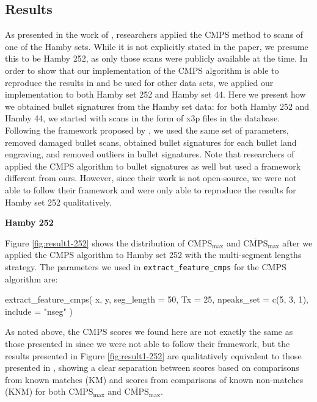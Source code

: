 \hypertarget{results}{%
\subsection{Results}\label{results}}

As presented in the work of \citet{cmps}, researchers applied the CMPS
method to scans of one of the Hamby sets. While it is not explicitly
stated in the paper, we presume this to be Hamby 252, as only those
scans were publicly available at the time. In order to show that our
implementation of the CMPS algorithm is able to reproduce the results in
\citet{cmps} and be used for other data sets, we applied our
implementation to both Hamby set 252 and Hamby set 44. Here we present
how we obtained bullet signatures from the Hamby set data: for both
Hamby 252 and Hamby 44, we started with scans in the form of x3p files
in the database. Following the framework proposed by \citet{aoas}, we
used the same set of parameters, removed damaged bullet scans, obtained
bullet signatures for each bullet land engraving, and removed outliers
in bullet signatures. Note that researchers of \citet{cmps} applied the
CMPS algorithm to bullet signatures as well but used a framework
different from ours. However, since their work is not open-source, we
were not able to follow their framework and were only able to reproduce
the results for Hamby set 252 qualitatively.

\textbf{Hamby 252}

Figure \ref{fig:result1-252} shows the distribution of
\(\mathrm{CMPS_{max}}\) and \(\mathrm{\overline{CMPS}_{max}}\) after we
applied the CMPS algorithm to Hamby set 252 with the multi-segment
lengths strategy. The parameters we used in
\texttt{extract\_feature\_cmps} for the CMPS algorithm are:

\begin{Schunk}
\begin{Sinput}
extract_feature_cmps(
  x, y,
  seg_length = 50,
  Tx = 25,
  npeaks_set = c(5, 3, 1),
  include = "nseg"
)
\end{Sinput}
\end{Schunk}

As noted above, the CMPS scores we found here are not exactly the same
as those presented in \citet{cmps} since we were not able to follow
their framework, but the results presented in Figure
\ref{fig:result1-252} are qualitatively equivalent to those presented in
\citet{cmps}, showing a clear separation between scores based on
comparisons from known matches (KM) and scores from comparisons of known
non-matches (KNM) for both \(\mathrm{CMPS_{max}}\) and
\(\mathrm{\overline{CMPS}_{max}}\).


